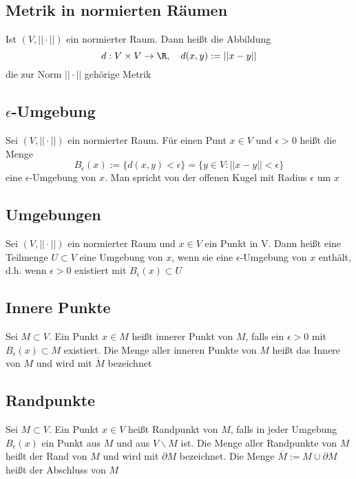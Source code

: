 	\subsection{Metrik in normierten Räumen}
		\begin{Definition} [ ]
			Ist $(V,||\cdot||)$ ein normierter Raum. Dann heißt die Abbildung
			$$
				d: V \times V \to \R, \quad d(x, y):=||x-y||
			$$
			die zur Norm $||\cdot||$ gehörige Metrik
		\end{Definition}
	\subsection{$\epsilon$-Umgebung}
		\begin{Definition} [ ]
			Sei $(V, ||\cdot||)$ ein normierter Raum. Für einen Punt $x\in V$ und $\epsilon>0$ heißt die Menge
			$$
				B_\epsilon(x):= \{d(x, y) < \epsilon\} = \{y\in V:||x-y||<\epsilon\}
			$$
			eine $\epsilon$-Umgebung von $x$. Man spricht von der offenen Kugel mit Radius $\epsilon$ um $x$
		\end{Definition}
	\subsection{Umgebungen}
		\begin{Definition} [ ]
			Sei $(V, ||\cdot||)$ ein normierter Raum und $x\in V$ ein Punkt in V. Dann heißt eine Teilmenge $U\subset V$ eine Umgebung von $x$, wenn sie eine $\epsilon$-Umgebung von $x$ enthält, d.h. wenn $\epsilon > 0$ existiert mit $B_\epsilon(x)\subset U$
		\end{Definition}
	\subsection{Innere Punkte}
		\begin{Definition} [ ]
			Sei $M\subset V$. Ein Punkt $x\in M$ heißt innerer Punkt von $M$, falls ein $\epsilon>0$ mit $B_\epsilon(x)\subset M$ existiert. \newline
			Die Menge aller inneren Punkte von $M$ heißt das Innere von $M$ und wird mit $\mathring{M}$ bezeichnet
		\end{Definition}
	\subsection{Randpunkte}
		\begin{Definition} [ ]
			Sei $M\subset V$. Ein Punkt $x\in V$ heißt Randpunkt von $M$, falls in jeder Umgebung $B_\epsilon(x)$ ein Punkt aus $M$ und aus $V\backslash M$ ist. \newline
			Die Menge aller Randpunkte von $M$ heißt der Rand von $M$ und wird mit $\partial M$ bezeichnet. \newline
			Die Menge $\overline{M}:=M\cup\partial M$ heißt der Abschluss von $M$
		\end{Definition}
